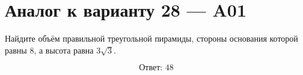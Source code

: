 \documentclass[12pt,a4paper]{article}
\begin{document}
\section*{Аналог к варианту 28 — A01}

Найдите объём правильной треугольной пирамиды, стороны основания которой равны \(8\), а высота равна \(3\sqrt3\).

\begin{center}
\end{center}

\[
\boxed{\text{Ответ: }48}
\]
\end{document}
